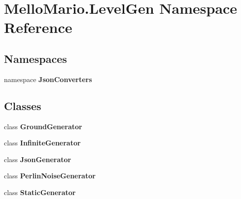\section{Mello\+Mario.\+Level\+Gen Namespace Reference}
\label{namespaceMelloMario_1_1LevelGen}
\subsection*{Namespaces}
\begin{DoxyCompactItemize}
\item 
namespace \textbf{ Json\+Converters}
\end{DoxyCompactItemize}
\subsection*{Classes}
\begin{DoxyCompactItemize}
\item 
class \textbf{ Ground\+Generator}
\item 
class \textbf{ Infinite\+Generator}
\item 
class \textbf{ Json\+Generator}
\item 
class \textbf{ Perlin\+Noise\+Generator}
\item 
class \textbf{ Static\+Generator}
\end{DoxyCompactItemize}

